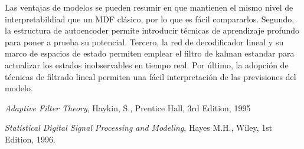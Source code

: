 \documentclass[a4paper,twoside,15pt]{article}
\begin{document}
Las ventajas de modelos se pueden resumir en que mantienen el mismo nivel de interpretabildiad que un MDF clásico, por lo que es fácil compararlos. Segundo, la estructura de autoencoder permite introducir técnicas de aprendizaje profundo para poner a prueba su potencial.
Tercero, la red de decodificador lineal y su marco de espacios de estado permiten emplear el filtro de kalman estandar para actualizar los estados inobservables en tiempo real.  Por último, la adopción de técnicas de filtrado lineal permiten una fácil interpretación de las previsiones del modelo.

\newpage
\begin{thebibliography}{1000}
	 \textit{Adaptive Filter Theory}, Haykin, S., Prentice Hall, 3rd Edition, 1995 %
	
	 \textit{Statistical Digital Signal Processing and Modeling},
	Hayes M.H., Wiley, 1st Edition, 1996.
\end{thebibliography}


\end{document}
